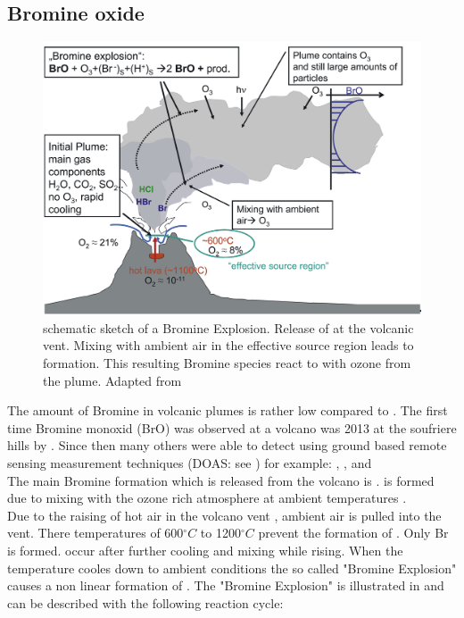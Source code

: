 \documentclass  [
  paper    = a4,
  BCOR     = 10mm,
  twoside,
  fontsize = 12pt,
  fleqn,
  toc      = bibnumbered,
  toc      = listofnumbered,
  numbers  = noendperiod,
  headings = normal,
  listof   = leveldown,
  version  = 3.03
]                                       {scrreprt}
\begin{document}
\subsection{Bromine oxide}
\begin{figure}
	\centering
	\includegraphics[width=0.8\linewidth]{Bilder/Simon/Bilder_Tung/BrO_Plume}
	\caption{schematic sketch of a Bromine Explosion.
		Release of  at the volcanic vent. Mixing with ambient air in the effective source region leads to  formation. This resulting Bromine species react to  with ozone from the plume. Adapted from \cite{bobrowski2007reactive}}
	\label{fig:broplume}
\end{figure}
The amount of Bromine in volcanic plumes is rather low compared to . The first time Bromine monoxid (BrO) was observed at a volcano was 2013 at the soufriere hills by \cite{bobrowski2003detection}. Since then many others were able to detect   using ground based remote sensing measurement techniques (DOAS: see ) for example:
\citet{bobrowski2007so2}, \citet{bobrowski2007reactive},\citet{vogel2011volcanic} and \cite{lubcke2014bro}
\\
The main Bromine formation which is released from the volcano is  .   is formed due to mixing with the ozone rich atmosphere at ambient temperatures \cite{bobrowski2007reactive}.\\
Due to the raising of hot air in the volcano vent , ambient air is pulled into the vent. There temperatures of  600$^{\circ}C$ to 1200$^{\circ}C$    prevent the formation of . Only Br is formed.   occur after further cooling and mixing while rising. When the temperature cooles down to ambient conditions the so called "Bromine Explosion" causes a non linear formation of .
The "Bromine Explosion" is illustrated in  and can be described with the following reaction cycle:
\end{document}
